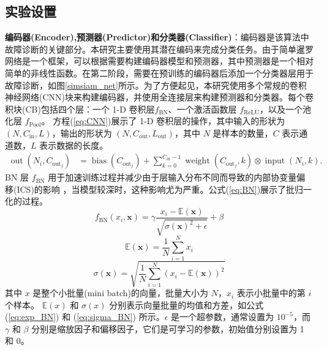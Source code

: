 \documentclass[master]{thesis-uestc}
\begin{document}
\subsection{实验设置}
\textbf{编码器(Encoder),预测器(Predictor)和分类器(Classifier)}：编码器是该算法中故障诊断的关键部分。本研究主要使用其潜在编码来完成分类任务。由于简单暹罗网络是一个框架，可以根据需要构建编码器模型和预测器，其中预测器是一个相对简单的非线性函数。在第二阶段，需要在预训练的编码器后添加一个分类器层用于故障诊断，如图\ref{simsiam_net}所示。为了方便起见，本研究使用多个常规的卷积神经网络(CNN)块来构建编码器，并使用全连接层来构建预测器和分类器。每个卷积块(CB)包括四个层：一个 1-D 卷积层\( f_{\text{BN}} \)、一个激活函数层 \( f_{\text{ReLU}} \)，以及一个池化层 \( f_{\text{Pool}} \)。 方程(\ref{eq:CNN})展示了 1-D 卷积层的操作，其中输入的形状为 \( (N, C_{\text{in}}, L) \)，输出的形状为 \( (N, C_{\text{out}}, L_{\text{out}}) \)，其中 \( N \) 是样本的数量，\( C \) 表示通道数，\( L \) 表示数据的长度。
\begin{equation}
    \begin{aligned}
    \operatorname{out}(N_i, C_{\mathrm{out}_j}) &= \operatorname{bias}(C_{\mathrm{out}_j}) + \sum_{k=0}^{C_{\mathrm{in}}-1} \operatorname{weight}(C_{\mathrm{out}_j}, k) \otimes \operatorname{input}(N_i, k).
    \end{aligned}
    \label{eq:CNN}
    \end{equation}
BN 层 \( f_{\text{BN}} \) 用于加速训练过程并减少由于层输入分布不同而导致的内部协变量偏移(ICS)的影响 ，当模型较深时，这种影响尤为严重。公式(\ref{eq:BN})展示了批归一化的过程。
\begin{equation}
    f_{\text{BN}}(x_i, \mathbf{x}) = \gamma \frac{x_i - \mathbb{E}(\mathbf{x})}{\sqrt{\sigma(\mathbf{x})^2 + \epsilon}} + \beta
\label{eq:BN}
\end{equation}    
\begin{equation}
\mathbb{E}(\mathbf{x}) = \frac{1}{N}\sum_{i=1}^N x_i
\label{eq:exp_BN}
\end{equation}
\begin{equation}
\sigma(\mathbf{x}) = \sqrt{\frac{1}{N}\sum_{i=1}^N (x_i - \mathbb{E}(\mathbf{x}))^2}
\label{eq:sigma_BN}
\end{equation}
其中 \( x \) 是整个小批量(mini batch)的向量，批量大小为 \( N \)，\( x_i \) 表示小批量中的第 \( i \) 个样本。  
\( \mathbb{E}(x) \) 和 \( \sigma(x) \) 分别表示向量批量的均值和方差，如公式 (\ref{eq:exp_BN}) 和 (\ref{eq:sigma_BN}) 所示。\( \epsilon \) 是一个超参数，通常设置为 \( 10^{-5} \)，而 \( \gamma \) 和 \( \beta \) 分别是缩放因子和偏移因子，它们是可学习的参数，初始值分别设置为 1 和 0。
\end{document}
